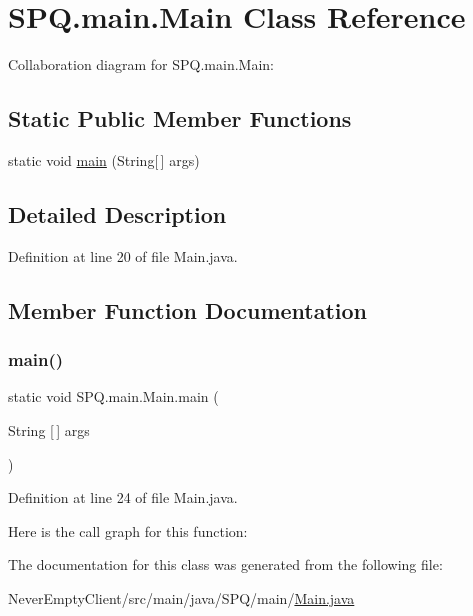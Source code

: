 \hypertarget{class_s_p_q_1_1main_1_1_main}{}\section{S\+P\+Q.\+main.\+Main Class Reference}
\label{class_s_p_q_1_1main_1_1_main}


Collaboration diagram for S\+P\+Q.\+main.\+Main\+:
\subsection*{Static Public Member Functions}
\begin{DoxyCompactItemize}
\item 
static void \mbox{\hyperlink{class_s_p_q_1_1main_1_1_main_ac7d2350f6924287c711b7e2bf1c430fa}{main}} (String\mbox{[}$\,$\mbox{]} args)
\end{DoxyCompactItemize}


\subsection{Detailed Description}


Definition at line 20 of file Main.\+java.



\subsection{Member Function Documentation}
\mbox{\label{class_s_p_q_1_1main_1_1_main_ac7d2350f6924287c711b7e2bf1c430fa}} 
\subsubsection{\texorpdfstring{main()}{main()}}
{\footnotesize\ttfamily static void S\+P\+Q.\+main.\+Main.\+main (\begin{DoxyParamCaption}\item[{String \mbox{[}$\,$\mbox{]}}]{args }\end{DoxyParamCaption})\hspace{0.3cm}{\ttfamily [static]}}



Definition at line 24 of file Main.\+java.

Here is the call graph for this function\+:


The documentation for this class was generated from the following file\+:\begin{DoxyCompactItemize}
\item 
Never\+Empty\+Client/src/main/java/\+S\+P\+Q/main/\mbox{\hyperlink{_main_8java}{Main.\+java}}\end{DoxyCompactItemize}
